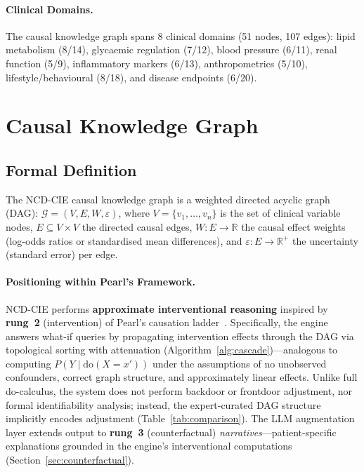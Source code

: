 \documentclass[runningheads]{llncs}
\begin{document}
\paragraph{Clinical Domains.}
The causal knowledge graph spans 8 clinical domains (51 nodes,
107 edges): lipid metabolism (8/14), glycaemic regulation (7/12),
blood pressure (6/11), renal function (5/9), inflammatory markers
(6/13), anthropometrics (5/10), lifestyle/behavioural (8/18), and
disease endpoints (6/20).

\section{Causal Knowledge Graph}\label{sec:kg}

\subsection{Formal Definition}\label{sec:formal}

The NCD-CIE causal knowledge graph is a weighted directed
acyclic graph (DAG):
$\mathcal{G} = (V, E, W, \varepsilon)$,
where $V=\{v_1,\ldots,v_n\}$ is the set of clinical variable nodes,
$E \subseteq V \times V$ the directed causal edges,
$W: E \rightarrow \mathbb{R}$ the causal effect weights
(log-odds ratios or standardised mean differences), and
$\varepsilon: E \rightarrow \mathbb{R}^+$ the uncertainty
(standard error) per edge.

\paragraph{Positioning within Pearl's Framework.}
NCD-CIE performs \textbf{approximate interventional reasoning}
inspired by \textbf{rung~2} (intervention) of Pearl's causation
ladder~\cite{pearl2018book,hernan2020causal}.
Specifically, the engine answers what-if queries by propagating
intervention effects through the DAG via topological sorting with
attenuation (Algorithm~\ref{alg:cascade})---analogous to computing
$P(Y \mid \mathrm{do}(X = x'))$ under the assumptions of no
unobserved confounders, correct graph structure, and approximately
linear effects.
Unlike full do-calculus, the system does not perform backdoor or
frontdoor adjustment, nor formal identifiability analysis;
instead, the expert-curated DAG structure implicitly encodes
adjustment (Table~\ref{tab:comparison}).
The LLM augmentation layer extends output to \textbf{rung~3}
(counterfactual) \emph{narratives}---patient-specific explanations
grounded in the engine's interventional computations
(Section~\ref{sec:counterfactual}).
\end{document}
